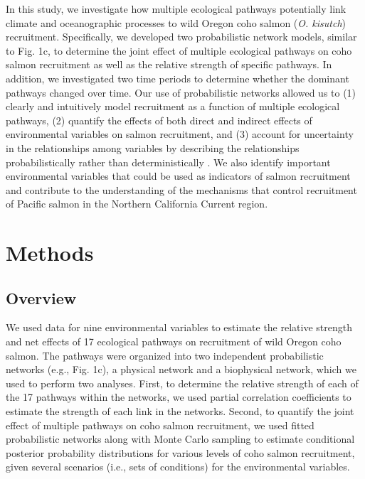 In this study, we investigate how multiple ecological pathways potentially link
climate and oceanographic processes to wild Oregon coho salmon (\emph{O.
kisutch}) recruitment. Specifically, we developed two probabilistic network
models, similar to Fig. 1c, to determine the joint effect of multiple ecological
pathways on coho salmon recruitment as well as the relative strength of specific
pathways. In addition, we investigated two time periods to determine whether the
dominant pathways changed over time. Our use of probabilistic networks allowed
us to (1) clearly and intuitively model recruitment as a function of multiple
ecological pathways, (2) quantify the effects of both direct and indirect
effects of environmental variables on salmon recruitment, and (3) account for
uncertainty in the relationships among variables by describing the relationships
probabilistically rather than deterministically \citep{Varis1995a}. We also
identify important environmental variables that could be used as indicators of
salmon recruitment and contribute to the understanding of the mechanisms that
control recruitment of Pacific salmon in the Northern California Current region.



\section{Methods}

\subsection{Overview}

We used data for nine environmental variables to estimate the relative strength
and net effects of 17 ecological pathways on recruitment of wild Oregon coho
salmon. The pathways were organized into two independent probabilistic networks
(e.g., Fig. 1c), a physical network and a biophysical network, which we used to
perform two analyses. First, to determine the relative strength of each of the
17 pathways within the networks, we used partial correlation coefficients to
estimate the strength of each link in the networks. Second, to quantify the
joint effect of multiple pathways on coho salmon recruitment, we used fitted
probabilistic networks along with Monte Carlo sampling to estimate conditional
posterior probability distributions for various levels of coho salmon
recruitment, given several scenarios (i.e., sets of conditions) for the
environmental variables.


